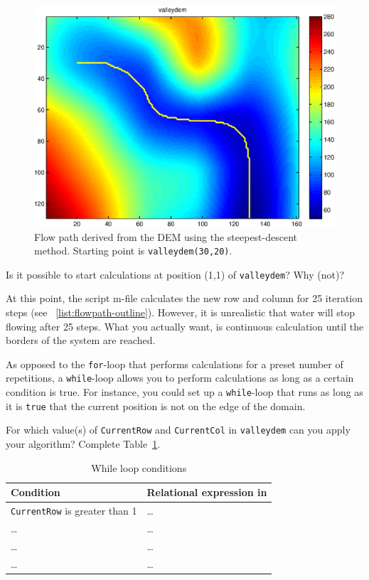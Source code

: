 \begin{figure}[htbp]
  \centering
    \includegraphics[width=1.0\textwidth]{./../eps/flowpath-valleydem1.eps}
  \caption{Flow path derived from the DEM using the steepest-descent method. Starting point is {\tt valleydem(30,20)}.}
  \label{fig:flowpath-valleydem1}
\end{figure}



\begin{action}
Is it possible to start calculations at position (1,1) of {\tt valleydem}? Why (not)?
\end{action}
At this point, the script m-file calculates the new row and column for 25 iteration steps (see \lstlistingname~\ref{list:flowpath-outline}). However, it is unrealistic that water will stop flowing after 25 steps. What you actually want, is continuous calculation until the borders of the system are reached. 

As opposed to the {\tt for}-loop that performs calculations for a preset number of repetitions, a {\tt while}-loop allows you to perform calculations as long as a certain condition is true. For instance, you could set up a {\tt while}-loop that runs as long as it is {\tt true} that the current position is not on the edge of the domain.

\begin{action}
For which value(s) of {\tt CurrentRow} and {\tt CurrentCol} in {\tt valleydem} can you apply your algorithm? Complete Table~\ref{tab:valleydem-edge}.
\end{action}
\begin{table}[ht]
\caption{While loop conditions}
\label{tab:valleydem-edge}
\centering
\begin{tabular}{|l|p{6cm}|}
\hline
\textbf{Condition}&\textbf{Relational expression in \MATLAB{}}\\
\hline
{\tt CurrentRow} is greater than 1&\ldots\\
\hline
\ldots&\ldots\\
\hline
\ldots&\ldots\\
\hline
\ldots&\ldots\\
\hline
\end{tabular}
\end{table}




